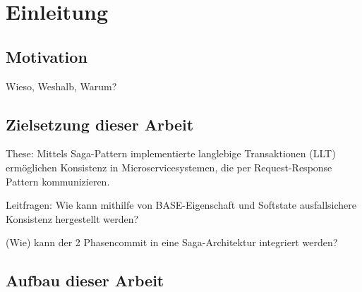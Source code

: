 \chapter{Einleitung}

\section{Motivation}

Wieso, Weshalb, Warum?

\section{Zielsetzung dieser Arbeit}

These: Mittels Saga-Pattern implementierte langlebige Transaktionen (LLT) ermöglichen Konsistenz in Microservicesystemen, die per Request-Response Pattern kommunizieren. 

Leitfragen: 
Wie kann mithilfe von BASE-Eigenschaft und Softstate ausfallsichere Konsistenz hergestellt werden?

(Wie) kann der 2 Phasencommit in eine Saga-Architektur integriert werden?

\section{Aufbau dieser Arbeit}

